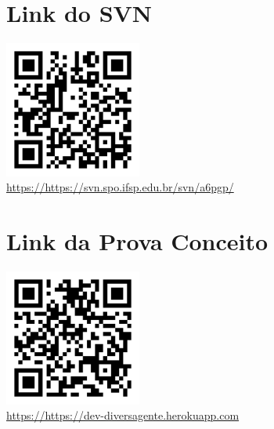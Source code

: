 \begin{figure}[htb]
	\section{Link do SVN}
	\includegraphics[width=0.40\textwidth]{anexos/svn.png} \\
	\hyperlink {Link do Blog}{https://https://svn.spo.ifsp.edu.br/svn/a6pgp/}
\end{figure}

\begin{figure}[htb]
	\section{Link da Prova Conceito}
	\includegraphics[width=0.40\textwidth]{anexos/heroku.png} \\
	\hyperlink {Link do Blog}{https://https://dev-diversagente.herokuapp.com}
\end{figure}